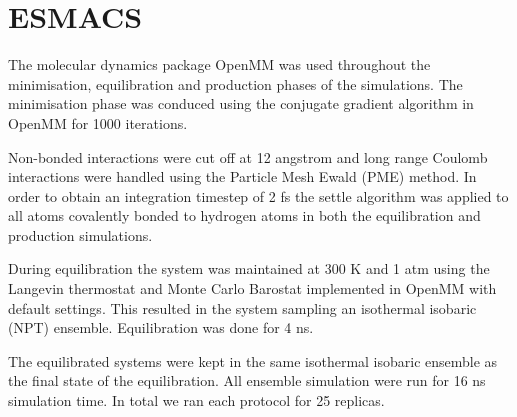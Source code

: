 
\section{ESMACS}

The molecular dynamics package OpenMM \cite{eastman2017openmm} was used throughout the minimisation, equilibration and production phases of the simulations. The minimisation phase was conduced using the conjugate gradient algorithm in OpenMM for 1000 iterations.

Non-bonded interactions were cut off at 12 angstrom and long range Coulomb interactions were handled using the Particle Mesh Ewald (PME) method. In order to obtain an integration timestep of 2 fs the settle \cite{miyamoto1992settle} algorithm was applied to all atoms covalently bonded to hydrogen atoms in both the equilibration and production simulations.

During equilibration the system was maintained at 300 K and 1 atm using the Langevin thermostat and Monte Carlo Barostat implemented in OpenMM with default settings. This resulted in the system sampling an isothermal isobaric (NPT) ensemble. Equilibration was done for 4 ns.

The equilibrated systems were kept in the same isothermal isobaric ensemble as the final state of the equilibration. All ensemble simulation were run for 16 ns simulation time. In total we ran each protocol for 25 replicas.
